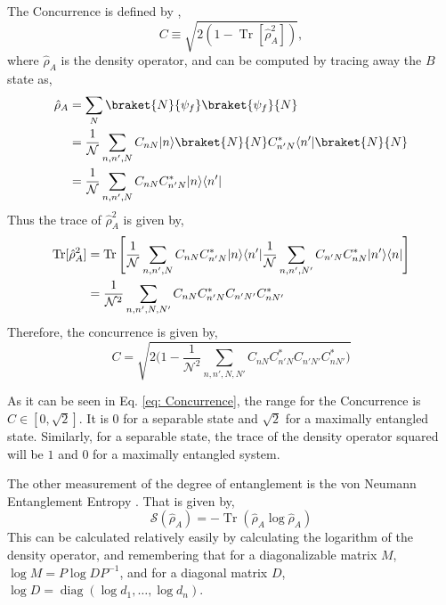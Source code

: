 \documentclass[11pt]{article}
\DeclarePairedDelimiter\bra{\langle}{\rvert}
\DeclarePairedDelimiter\ket{\lvert}{\rangle}
\DeclareMathOperator{\Tr}{Tr}
\DeclareMathOperator{\diag}{diag}
\begin{document}
The Concurrence is defined by \cite{PhysRevLett.78.5022, PhysRevA.64.042315},
\begin{equation}
    C \equiv \sqrt{2(1 - \Tr[\hat{\rho}_A^2])},
\end{equation}
where $\hat{\rho}_A$ is the density operator, and can be computed by tracing away the $B$ state as,
\begin{equation}
    \begin{aligned}
        \hat{\rho}_A &= \sum_{N} \braket{N}{\psi_f} \braket{\psi_f}{N} \\
        &= \frac{1}{\mathcal{N}} \sum_{n,n',N} C_{nN} \ket{n} \braket{N}{N} C^{*}_{n'N} \bra{n'} \braket{N}{N}  \\
        &= \frac{1}{\mathcal{N}} \sum_{n,n',N} C_{nN}C^{*}_{n'N} \ket{n}\bra{n'}
    \end{aligned}
    \label{eq: DensityMatrix}
\end{equation}
Thus the trace of $\hat{\rho}_A^2$ is given by, 
\begin{equation}
    \begin{aligned}
        \Tr[\hat{\rho}_A^2] &= \Tr\Bigg[\frac{1}{\mathcal{N}} \sum_{n,n',N} C_{nN}C^{*}_{n'N} \ket{n}\bra{n'} \frac{1}{\mathcal{N}} \sum_{n,n',N'} C_{n'N}C^{*}_{nN} \ket{n'}\bra{n}\Bigg] \\
        &= \frac{1}{\mathcal{N}^2}\sum_{n,n',N,N'} C_{nN}C^{*}_{n'N} C_{n'N'}C^{*}_{nN'}
    \end{aligned}
\end{equation}
Therefore, the concurrence is given by,
\begin{equation}
    C = \sqrt{2\bigg(1 - \frac{1}{\mathcal{N}^2}\sum_{n,n',N,N'}C_{nN}C^{*}_{n'N} C_{n'N'}C^{*}_{nN'}\bigg)}
    \label{eq: Concurrence}
\end{equation}
\begin{note}
    As it can be seen in Eq. \ref{eq: Concurrence}, the range for the Concurrence is $C \in [0, \sqrt{2}]$. It is $0$ for a separable state and $\sqrt{2}$ for a maximally entangled state. Similarly, for a separable state, the trace of the density operator squared will be $1$ and $0$ for a maximally entangled system.
\end{note}
The other measurement of the degree of entanglement is the von Neumann Entanglement Entropy \cite{Bala_2012, PhysRevA.101.052110}. That is given by,
\begin{equation}
    \mathcal{S}(\hat{\rho}_A) = -\Tr(\hat{\rho}_A \log{\hat{\rho}_A})
    \label{eq: Entropy}
\end{equation}
This can be calculated relatively easily by calculating the logarithm of the density operator, and remembering that for a diagonalizable matrix $M$, $\log{M} = P\log{D}P^{-1}$, and for a diagonal matrix $D$, $\log{D} = \diag(\log{d_1},\dots,\log{d_n})$.
\end{document}
